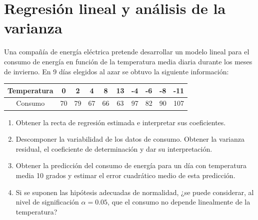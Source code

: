 \section{Regresión lineal y análisis de la varianza}

%
% 
% 
% 
% 
% 
% 
% 
% 
% 
% 
% 
% 
% 
% 
%

\begin{ejercicio}
    Una compañía de energía eléctrica pretende desarrollar un modelo lineal para el consumo de energía en función de la temperatura media diaria durante los meses de invierno. En 9 días elegidos al azar se obtuvo la siguiente información:
    \begin{table}[H]
    \centering
    \begin{tabular}{c|ccccccccc}
        Temperatura & 0 & 2 & 4 & 8 & 13 & -4 & -6 & -8 & -11 \\
        \hline
        Consumo & 70 & 79 & 67 & 66 & 63 & 97 & 82 & 90 & 107
    \end{tabular}
    \end{table}
    \begin{enumerate}[label=\alph*)]
        \item Obtener la recta de regresión estimada e interpretar sus coeficientes.
        \item Descomponer la variabilidad de los datos de consumo. Obtener la varianza residual, el coeficiente de determinación y dar su interpretación.
        \item Obtener la predicción del consumo de energía para un día con temperatura media 10 grados y estimar el error cuadrático medio de esta predicción.
        \item Si se suponen las hipótesis adecuadas de normalidad, ¿se puede considerar, al nivel de significación $\alpha=0.05$, que el consumo no depende linealmente de la temperatura?
    \end{enumerate}
\end{ejercicio}

